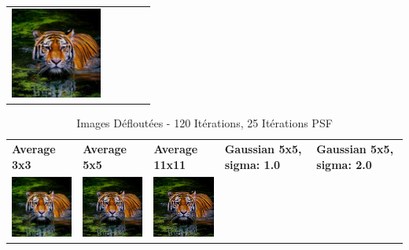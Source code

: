 \begin{table}[h!]
\begin{tabular}{>{\centering\arraybackslash}m{3cm} >{\centering\arraybackslash}m{3cm} >{\centering\arraybackslash}m{3cm} >{\centering\arraybackslash}m{3cm} >{\centering\arraybackslash}m{3cm}}
        \includegraphics[width=3cm]{images/blind_processed/tiger/gaussian_5x5_sigma2.0/tiger_unblurred_60-iter_25-psf-iter.png}                                                                                                                         \\
    \end{tabular}
\end{table}

\begin{table}[h!]
    \centering
    \captionsetup{justification=centering}
    \caption*{Images Défloutées - 120 Itérations, 25 Itérations PSF}
    \begin{tabular}{>{\centering\arraybackslash}m{3cm} >{\centering\arraybackslash}m{3cm} >{\centering\arraybackslash}m{3cm} >{\centering\arraybackslash}m{3cm} >{\centering\arraybackslash}m{3cm}}
        \textbf{Average 3x3}                                                                                                     & \textbf{Average 5x5} & \textbf{Average 11x11} & \textbf{Gaussian 5x5, sigma: 1.0} & \textbf{Gaussian 5x5, sigma: 2.0} \\
        \includegraphics[width=3cm]{images/blind_processed/tiger/average_3x3/tiger_unblurred_120-iter_25-psf-iter.png}           &
        \includegraphics[width=3cm]{images/blind_processed/tiger/average_5x5/tiger_unblurred_120-iter_25-psf-iter.png}           &
        \includegraphics[width=3cm]{images/blind_processed/tiger/average_11x11/tiger_unblurred_120-iter_25-psf-iter.png}         &

\end{tabular}
\end{table}
